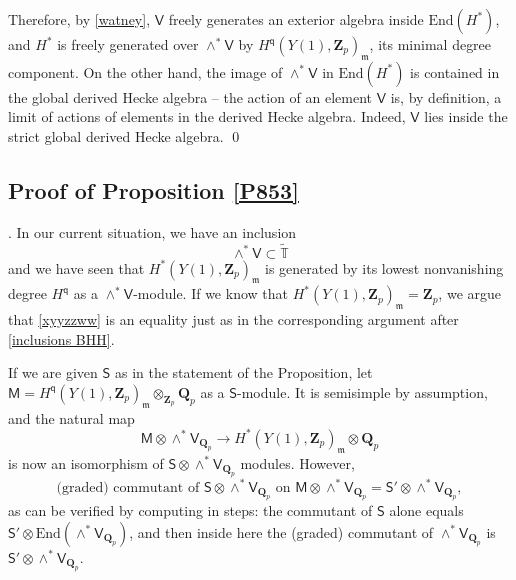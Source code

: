 \documentclass[10pt]{amsart}
\newcommand{\changecolor}{black}
\newcommand{\Z}{\mathbf{Z}}
\newcommand{\gHecke}{\tilde{\mathbb{T}}}
\newcommand{\Vinf}{\mathsf{V}}
\newcommand{\Q}{\mathbf{Q}}
\theoremstyle{remark}
\newcommand{\BWq}{\mathsf{q}}
\begin{document}
  Therefore, by \eqref{watney},  $\Vinf$ freely generates an exterior algebra inside $\mathrm{End}(H^*)$, and $H^*$ is freely generated over $\wedge^* \Vinf$
  by $H^{\BWq}(Y(1), \Z_p)_{\mathfrak{m}}$, its minimal degree component. 
 On the other hand, the image of $\wedge^* \Vinf$ in $\mathrm{End}(H^*)$ is contained in the global derived Hecke algebra --
 the action of an element $\Vinf$ is, by definition, a limit of actions of elements in the derived Hecke algebra.  Indeed,
 $\Vinf$ lies inside the strict global derived Hecke algebra. 
  \qed 

\subsection{Proof of Proposition \ref{P853}} \label{P853proof}

 {\color{\changecolor} . In our current situation, we have an inclusion
\begin{equation} \label{xyyzzww} \wedge^* \mathsf{V} \subset \gHecke\end{equation}
and we have seen that $H^*(Y(1), \Z_p)_{\mathfrak{m}}$
 is generated by its lowest nonvanishing degree $H^{\BWq}$ as a  
 $\wedge^* \mathsf{V}$-module.  
 If we know that $H^*(Y(1), \Z_p)_{\mathfrak{m}} = \Z_p$, 
 we argue that \eqref{xyyzzww} is an equality
 just as in the corresponding argument after  \eqref{inclusions BHH}.
 
 If we are given $\mathsf{S}$ as in the statement of the Proposition, 
 let $\mathsf{M} = H^{\BWq}(Y(1), \Z_p)_{\mathfrak{m}} \otimes_{\Z_p} \Q_p$
 as a $\mathsf{S}$-module. It is semisimple by assumption, and the natural map
 $$ \mathsf{M} \otimes \wedge^* \mathsf{V}_{\Q_p}      \rightarrow H^*(Y(1), \Z_p)_{\mathfrak{m}} \otimes \Q_p$$
 is now an isomorphism of $\mathsf{S} \otimes \wedge^* \mathsf{V}_{\Q_p}$ modules. 
 However,
$$\mbox{(graded) commutant of $\mathsf{S} \otimes \wedge^* \mathsf{V}_{\Q_p}$   on $\mathsf{M} \otimes \wedge^* \mathsf{V}_{\Q_p}$} =   \mathsf{S}' \otimes  \wedge^* \mathsf{V}_{\Q_p},$$
as can be verified by computing in steps:  the commutant of $\mathsf{S}$ alone
 equals $  \mathsf{S}' \otimes \mathrm{End}(\wedge^* \mathsf{V}_{\Q_p})$,
 and then inside here the (graded) commutant of $\wedge^* \mathsf{V}_{\Q_p}$   is $\mathsf{S}' \otimes \wedge^* \mathsf{V}_{\Q_p} $.  
 

}
\end{document}
